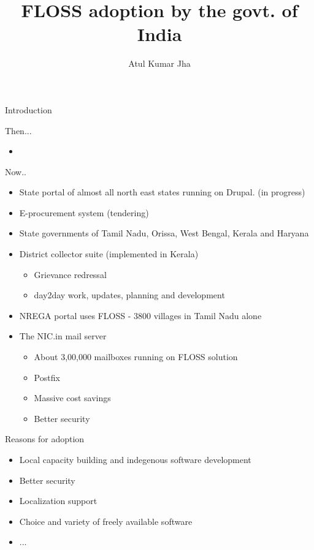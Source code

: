 \documentclass{beamer}
\author{Atul Kumar Jha}
\title{FLOSS adoption by the govt. of India}
\institute{CSS Corp. \\ ETAS Open Source Services }
\begin{document}
	\begin{frame}{Introduction}
	\titlepage
	\end{frame}

	\begin{frame}{Then...}
		\begin{itemize}
			\item 
		\end{itemize}
	\end{frame}
	
	\begin{frame}{Now..}
		\begin{itemize}
			\item State portal of almost all north east states running on Drupal. (in progress)
			\item E-procurement system (tendering) 
			\item State governments of Tamil Nadu, Orissa, West Bengal, Kerala and Haryana
			\item District collector suite (implemented in Kerala)
				\begin{itemize}
					\item Grievance redressal
					\item day2day work, updates, planning and development
				\end{itemize}
			\item NREGA portal uses FLOSS - 3800 villages in Tamil Nadu alone
			\item The NIC.in mail server
				 \begin{itemize}
				 	\item About 3,00,000 mailboxes running on FLOSS solution
				 	\item Postfix
				 	\item Massive cost savings
				 	\item Better security
				 \end{itemize}
		\end{itemize}
	\end{frame}

	\begin{frame}{Reasons for adoption}
		\begin{itemize}[<+->]
			\item Local capacity building and indegenous software development
			\item Better security
			\item Localization support
			\item Choice and variety of freely available software
			\item ...
		\end{itemize}
	\end{frame}
\end{document}

